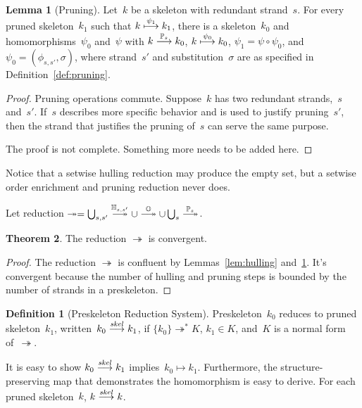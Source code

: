 \documentclass[12pt]{article}
\theoremstyle{definition}
\newtheorem{defn}{Definition}[section]
\newtheorem{thm}{Theorem}[section]
\newtheorem{lem}[thm]{Lemma}
\newenvironment{note}{\itshape\par\noindent}{}
\begin{document}
\begin{lem}[Pruning]\label{lem:pruning}
Let~$k$ be a skeleton with redundant strand~$s$.  For every pruned
skeleton~$k_1$ such that $k\stackrel{\psi_1}{\longmapsto}k_1$, there is a
skeleton~$k_0$ and homomorphisms~$\psi_0$ and~$\psi$ with
$k\stackrel{\mathbb P_s}{\longrightarrow}k_0$, $k\stackrel{\psi_0}{\longmapsto}k_0$,
$\psi_1=\psi\circ\psi_0$, and $\psi_0=(\phi_{s,s'},\sigma)$, where
strand~$s'$ and substitution~$\sigma$ are as specified in
Definition~\ref{def:pruning}.
\end{lem}

\begin{proof}
Pruning operations commute.  Suppose~$k$ has two redundant
strands,~$s$ and~$s'$.  If~$s$ describes more specific behavior and
is used to justify pruning~$s'$, then the strand that justifies the
pruning of~$s$ can serve the same purpose.
\begin{note}
The proof is not complete.  Something more needs to be added here.
\end{note}
\end{proof}

Notice that a setwise hulling reduction may produce the empty set, but
a setwise order enrichment and pruning reduction never does.

Let reduction $\twoheadrightarrow=
\bigcup_{s,s'}\setreduction{\ops{H}_{s,s'}}\cup\setreduction{\ops{O}}\cup
\bigcup_s\setreduction{\ops{P}_s}$.

\begin{thm}
The reduction $\twoheadrightarrow$ is convergent.
\end{thm}

\begin{proof}
The reduction $\twoheadrightarrow$ is confluent by
Lemmas~\ref{lem:hulling} and~\ref{lem:pruning}.  It's convergent
because the number of hulling and pruning steps is bounded by the
number of strands in a preskeleton.
\end{proof}

\begin{defn}[Preskeleton Reduction System]
Preskeleton~$k_0$ reduces to pruned skeleton~$k_1$,
written~$k_0\stackrel{\operatorname{\mathit{skel}}}{\longrightarrow}k_1$, if
$\{k_0\}\twoheadrightarrow^\ast K$, $k_1\in K$, and~$K$ is a normal
form of~$\twoheadrightarrow$.
\end{defn}

It is easy to show $k_0\stackrel{\operatorname{\mathit{skel}}}{\longrightarrow}k_1$ implies~$k_0\mapsto
k_1$.  Furthermore, the structure-preserving map that demonstrates the
homomorphism is easy to derive.  For each pruned skeleton~$k$,
$k\stackrel{\operatorname{\mathit{skel}}}{\longrightarrow}k$.
\end{document}
